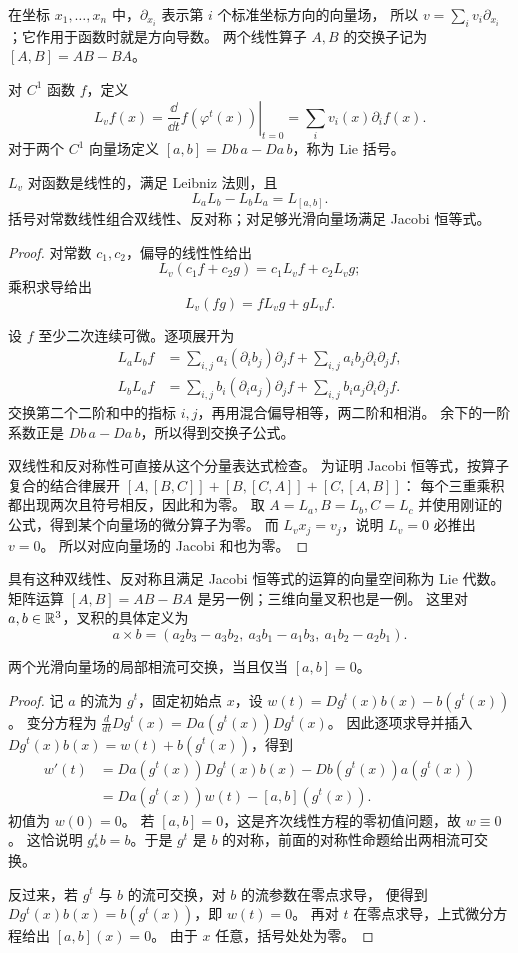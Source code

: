 \noindent
在坐标 $x_1,\ldots,x_n$ 中，$\partial_{x_i}$ 表示第 $i$ 个标准坐标方向的向量场，
所以 $v=\sum_i v_i\partial_{x_i}$；它作用于函数时就是方向导数。
两个线性算子 $A,B$ 的交换子记为 $[A,B]=AB-BA$。
\medskip
\begin{definition}
对 $C^1$ 函数 $f$，定义
\[
 L_vf(x)=\left.\frac{\dd}{\dd t}f(\varphi^t(x))\right|_{t=0}
 =\sum_i v_i(x)\partial_i f(x).
\]
对于两个 $C^1$ 向量场定义
$[a,b]=Db\,a-Da\,b$，称为 Lie 括号。
\end{definition}
\begin{proposition}
$L_v$ 对函数是线性的，满足 Leibniz 法则，且
\[
 L_aL_b-L_bL_a=L_{[a,b]}.
\]
括号对常数线性组合双线性、反对称；对足够光滑向量场满足 Jacobi 恒等式。
\end{proposition}
\begin{proof}
对常数 $c_1,c_2$，偏导的线性性给出
\[
 L_v(c_1f+c_2g)=c_1L_vf+c_2L_vg;
\]
乘积求导给出 
\[
 L_v(fg)=fL_vg+gL_vf.
\]

设 $f$ 至少二次连续可微。逐项展开为
\begin{align*}
 L_aL_bf&=\sum_{i,j}a_i(\partial_i b_j)\partial_jf
              +\sum_{i,j}a_ib_j\partial_i\partial_jf,\\
 L_bL_af&=\sum_{i,j}b_i(\partial_i a_j)\partial_jf
              +\sum_{i,j}b_ia_j\partial_i\partial_jf.
\end{align*}
交换第二个二阶和中的指标 $i,j$，再用混合偏导相等，两二阶和相消。
余下的一阶系数正是 $Db\,a-Da\,b$，所以得到交换子公式。

双线性和反对称性可直接从这个分量表达式检查。
为证明 Jacobi 恒等式，按算子复合的结合律展开
$[A,[B,C]]+[B,[C,A]]+[C,[A,B]]$：
每个三重乘积都出现两次且符号相反，因此和为零。
取 $A=L_a,B=L_b,C=L_c$ 并使用刚证的公式，得到某个向量场的微分算子为零。
而 $L_vx_j=v_j$，说明 $L_v=0$ 必推出 $v=0$。
所以对应向量场的 Jacobi 和也为零。
\end{proof}
具有这种双线性、反对称且满足 Jacobi 恒等式的运算的向量空间称为 Lie 代数。
矩阵运算 $[A,B]=AB-BA$ 是另一例；三维向量叉积也是一例。
这里对 $a,b\in\mathbb{R}^3$，叉积的具体定义为
\[
 a\times b=(a_2b_3-a_3b_2,\ a_3b_1-a_1b_3,\ a_1b_2-a_2b_1).
\]

\begin{theorem}
两个光滑向量场的局部相流可交换，当且仅当 $[a,b]=0$。
\end{theorem}
\begin{proof}
记 $a$ 的流为 $g^t$，固定初始点 $x$，设
$w(t)=Dg^t(x)b(x)-b(g^t(x))$。
变分方程为 $\frac d{dt}Dg^t(x)=Da(g^t(x))Dg^t(x)$。
因此逐项求导并插入 $Dg^t(x)b(x)=w(t)+b(g^t(x))$，得到
\begin{align*}
 w'(t)&=Da(g^t(x))Dg^t(x)b(x)-Db(g^t(x))a(g^t(x))\\
 &=Da(g^t(x))w(t)-[a,b](g^t(x)).
\end{align*}
初值为 $w(0)=0$。
若 $[a,b]=0$，这是齐次线性方程的零初值问题，故 $w\equiv0$。
这恰说明 $g^t_*b=b$。于是 $g^t$ 是 $b$ 的对称，前面的对称性命题给出两相流可交换。

反过来，若 $g^t$ 与 $b$ 的流可交换，对 $b$ 的流参数在零点求导，
便得到 $Dg^t(x)b(x)=b(g^t(x))$，即 $w(t)=0$。
再对 $t$ 在零点求导，上式微分方程给出 $[a,b](x)=0$。
由于 $x$ 任意，括号处处为零。
\end{proof}

